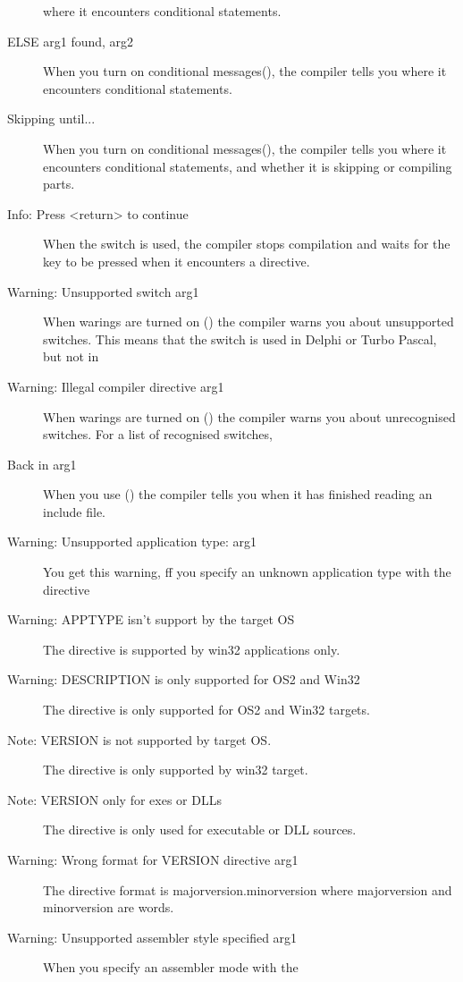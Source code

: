 \begin{description}
 where it encounters conditional statements.
\item [ELSE arg1 found, arg2]
 When you turn on conditional messages(), the compiler tells you
 where it encounters conditional statements.
\item [Skipping until...]
 When you turn on conditional messages(), the compiler tells you
 where it encounters conditional statements, and whether it is skipping or
 compiling parts.
\item [Info: Press <return> to continue]
 When the  switch is used, the compiler stops compilation
 and waits for the  key to be pressed when it encounters
 a  directive.
\item [Warning: Unsupported switch arg1]
 When warings are turned on () the compiler warns you about
 unsupported switches. This means that the switch is used in Delphi or
 Turbo Pascal, but not in \fpc
\item [Warning: Illegal compiler directive arg1]
 When warings are turned on () the compiler warns you about
 unrecognised switches. For a list of recognised switches, \progref
\item [Back in arg1]
 When you use () the compiler tells you when it has finished
 reading an include file.
\item [Warning: Unsupported application type: arg1]
 You get this warning, ff you specify an unknown application type
 with the directive 
\item [Warning: APPTYPE isn't support by the target OS]
 The  directive is supported by win32 applications only.
\item [Warning: DESCRIPTION is only supported for OS2 and Win32]
 The  directive is only supported for OS2 and Win32 targets.
\item [Note: VERSION is not supported by target OS.]
 The  directive is only supported by win32 target.
\item [Note: VERSION only for exes or DLLs]
 The  directive is only used for executable or DLL sources.
\item [Warning: Wrong format for VERSION directive arg1]
 The  directive format is majorversion.minorversion
 where majorversion and minorversion are words.
\item [Warning: Unsupported assembler style specified arg1]
 When you specify an assembler mode with the 

\end{description}
